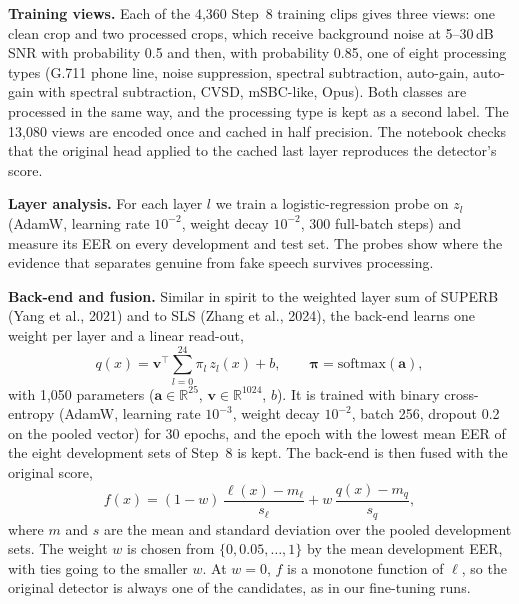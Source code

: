 \documentclass[10pt,a4paper,twocolumn]{article}
\newcommand{\llr}{\ell}
\begin{document}
\textbf{Training views.} Each of the 4,360 Step~8 training clips gives three views: one clean crop and two processed crops, which receive background noise at 5--30\,dB SNR with probability 0.5 and then, with probability 0.85, one of eight processing types (G.711 phone line, noise suppression, spectral subtraction, auto-gain, auto-gain with spectral subtraction, CVSD, mSBC-like, Opus). Both classes are processed in the same way, and the processing type is kept as a second label. The 13,080 views are encoded once and cached in half precision. The notebook checks that the original head applied to the cached last layer reproduces the detector's score.

\textbf{Layer analysis.} For each layer $l$ we train a logistic-regression probe on $z_l$ (AdamW, learning rate $10^{-2}$, weight decay $10^{-2}$, 300 full-batch steps) and measure its EER on every development and test set. The probes show where the evidence that separates genuine from fake speech survives processing.

\textbf{Back-end and fusion.} Similar in spirit to the weighted layer sum of SUPERB (Yang et al., 2021) and to SLS (Zhang et al., 2024), the back-end learns one weight per layer and a linear read-out,
\begin{equation}
q(x)=\mathbf{v}^{\top}\sum_{l=0}^{24}\pi_l\,z_l(x)+b,\qquad \boldsymbol{\pi}=\mathrm{softmax}(\mathbf{a}),
\label{eq:backend}
\end{equation}
with 1,050 parameters ($\mathbf{a}\in\mathbb{R}^{25}$, $\mathbf{v}\in\mathbb{R}^{1024}$, $b$). It is trained with binary cross-entropy (AdamW, learning rate $10^{-3}$, weight decay $10^{-2}$, batch 256, dropout 0.2 on the pooled vector) for 30 epochs, and the epoch with the lowest mean EER of the eight development sets of Step~8 is kept. The back-end is then fused with the original score,
\begin{equation}
f(x)=(1-w)\,\frac{\llr(x)-m_{\llr}}{s_{\llr}}+w\,\frac{q(x)-m_q}{s_q},
\label{eq:fusion}
\end{equation}
where $m$ and $s$ are the mean and standard deviation over the pooled development sets. The weight $w$ is chosen from $\{0,0.05,\dots,1\}$ by the mean development EER, with ties going to the smaller $w$. At $w=0$, $f$ is a monotone function of $\llr$, so the original detector is always one of the candidates, as in our fine-tuning runs.
\end{document}

